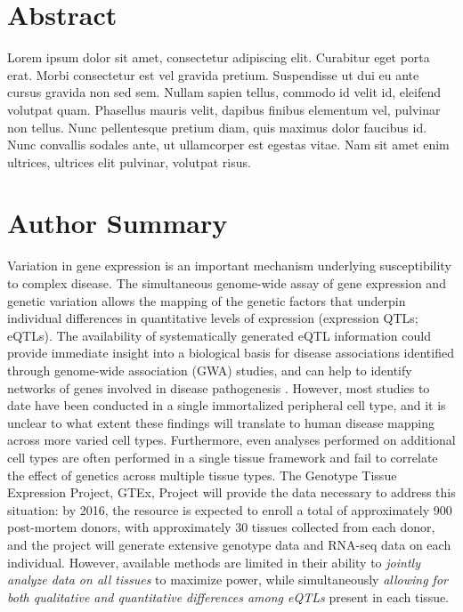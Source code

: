 \documentclass[10pt,letterpaper]{article}
\begin{document}
\section*{Abstract}
Lorem ipsum dolor sit amet, consectetur adipiscing elit. Curabitur eget porta erat. Morbi consectetur est vel gravida pretium. Suspendisse ut dui eu ante cursus gravida non sed sem. Nullam sapien tellus, commodo id velit id, eleifend volutpat quam. Phasellus mauris velit, dapibus finibus elementum vel, pulvinar non tellus. Nunc pellentesque pretium diam, quis maximus dolor faucibus id. Nunc convallis sodales ante, ut ullamcorper est egestas vitae. Nam sit amet enim ultrices, ultrices elit pulvinar, volutpat risus.


\section*{Author Summary}
Variation in gene expression is an important mechanism underlying susceptibility to complex disease. The simultaneous genome-wide assay of gene expression and genetic variation allows the mapping of the genetic factors that underpin individual differences in quantitative levels of expression (expression QTLs; eQTLs). The availability of systematically generated eQTL information could provide immediate insight into a biological basis for disease associations identified through genome-wide association (GWA) studies, and can help to identify networks of genes 
involved in disease pathogenesis \cite{cookson_mapping_2009}. However, most studies to date have been conducted in a single immortalized peripheral cell type, and it is unclear to what extent these findings will translate to human disease mapping across more varied cell types. 
Furthermore, even analyses performed on additional cell types are often performed in a single tissue framework \cite{majewski_study_2011,gilad_revealing_2008} and fail to correlate the effect of genetics across multiple tissue types.  The Genotype Tissue Expression Project, GTEx, Project will provide the data necessary to address this situation: by 2016, the resource is expected to enroll a total of approximately 900 post-mortem donors, with approximately 30 tissues collected from each donor, and the project
will generate extensive genotype data and RNA-seq data on each individual. However,  available methods are limited in their ability to {\it jointly analyze data on all tissues} to maximize power, while
simultaneously {\it allowing for both qualitative and quantitative differences among eQTLs} present
in each tissue.
\end{document}
